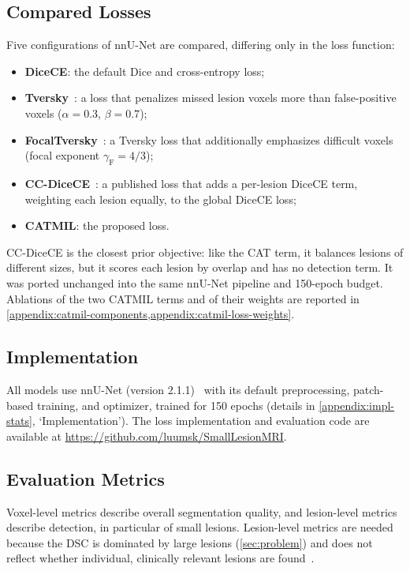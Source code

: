 \subsection{Compared Losses}

Five configurations of nnU-Net are compared, differing only in the loss
function:
\begin{itemize}
    \item \textbf{DiceCE}: the default Dice and cross-entropy loss;
    \item \textbf{Tversky}~\cite{salehi_tversky_2017}: a loss that
    penalizes missed lesion voxels more than false-positive voxels
    ($\alpha=0.3$, $\beta=0.7$);
    \item \textbf{FocalTversky}~\cite{abraham_novel_2019}: a Tversky loss
    that additionally emphasizes difficult voxels (focal exponent
    $\gamma_{\mathrm{F}}=4/3$);
    \item \textbf{CC-DiceCE}~\cite{bouteille_learning_2026}: a published
    loss that adds a per-lesion DiceCE term, weighting each lesion equally,
    to the global DiceCE loss;
    \item \textbf{CATMIL}: the proposed loss.
\end{itemize}
CC-DiceCE is the closest prior objective: like the CAT term, it balances
lesions of different sizes, but it scores each lesion by overlap and has no
detection term. It was ported unchanged into the same nnU-Net pipeline and
150-epoch budget. Ablations of the two CATMIL terms and of their weights
are reported in
\cref{appendix:catmil-components,appendix:catmil-loss-weights}.

\subsection{Implementation}

All models use nnU-Net (version 2.1.1)~\cite{isensee_nnu-net_2021} with
its default preprocessing, patch-based training, and optimizer, trained for
150 epochs (details in \cref{appendix:impl-stats}, `Implementation'). The loss
implementation and evaluation code are available at
\url{https://github.com/luumsk/SmallLesionMRI}.

\subsection{Evaluation Metrics}

Voxel-level metrics describe overall segmentation quality, and lesion-level
metrics describe detection, in particular of small lesions. Lesion-level
metrics are needed because the DSC is dominated by large lesions
(\cref{sec:problem}) and does not reflect whether individual, clinically
relevant lesions are found~\cite{basit_rethinking_2026,jaus_every_2025}.

